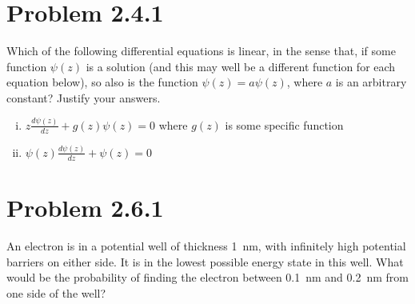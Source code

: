 
\DeclareSIUnit{}





\pagebreak

\section*{Problem 2.4.1}

Which of the following differential equations is linear, in the sense
that, if some function $\psi(z)$ is a
solution (and this may well be a different function for each equation
below), so also is the function
$\psi(z) = a\psi(z)$, where $a$ is an arbitrary constant? Justify your answers.

\begin{enumerate}[(i)]
  \item $z\frac{d\psi(z)}{dz} + g(z)\psi(z) = 0$ where $g(z)$ is some
    specific function


  \item $\psi(z)\frac{d\psi(z)}{dz} + \psi(z) = 0$


\end{enumerate}

\pagebreak

\section*{Problem 2.6.1}

An electron is in a potential well of thickness \SI{1}{\nano\meter},
with infinitely high potential barriers on either
side. It is in the lowest possible energy state in this well. What
would be the probability of finding the
electron between \SI{0.1}{\nano\meter} and \SI{0.2}{\nano\meter} from
one side of the well?

